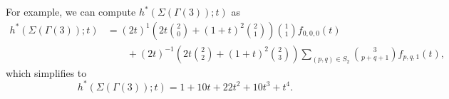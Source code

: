 \documentclass{amsart}
\numberwithin{equation}{section}
\theoremstyle{plain}
\theoremstyle{definition}
\begin{document}

For example, we can compute $h^*(\Sigma(\Gamma(3));t)$ as 
\[\begin{aligned}
 h^*(\Sigma(\Gamma(3));t) &= (2t)^1\left(2t\binom{2}{0} + (1+t)^2\binom{2}{1}\right)\binom{1}{1}f_{0,0,0}(t) \\
 &{} \qquad + (2t)^{-1}\left(2t\binom{2}{2} + (1+t)^2\binom{2}{3}\right)\sum_{(p,q) \in S_2} \binom{3}{p+q+1}f_{p,q,1}(t),
\end{aligned}
\]
which simplifies to 
\[
    h^*(\Sigma(\Gamma(3));t) = 1 + 10t + 22t^2 + 10t^3 + t^4.
\]
\end{document}

